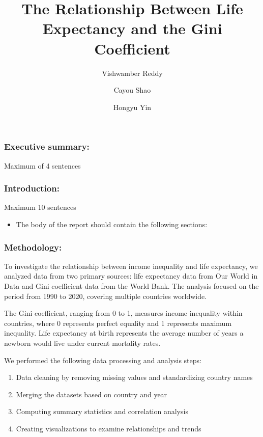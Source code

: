 \documentclass[
  11pt,
]{article}
\title{The Relationship Between Life Expectancy and the Gini
Coefficient}
\author{Vishwamber Reddy \and Cayou Shao \and Hongyu Yin}
\date{}
\providecommand{\tightlist}{%
  \setlength{\itemsep}{0pt}\setlength{\parskip}{0pt}}\usepackage{longtable,booktabs,array}
\renewcommand*\contentsname{Table of contents}
\newcommand\contentsname{Table of contents}
\begin{document}
\maketitle

\renewcommand*\contentsname{Table of contents}
{
\hypersetup{linkcolor=}
\setcounter{tocdepth}{3}
\tableofcontents
}

\subsubsection{Executive summary:}\label{executive-summary}

Maximum of 4 sentences

\subsubsection{Introduction:}\label{introduction}

Maximum 10 sentences

\begin{itemize}
\tightlist
\item
  The body of the report should contain the following sections:
\end{itemize}

\subsubsection{Methodology:}\label{methodology}

To investigate the relationship between income inequality and life
expectancy, we analyzed data from two primary sources: life expectancy
data from Our World in Data and Gini coefficient data from the World
Bank. The analysis focused on the period from 1990 to 2020, covering
multiple countries worldwide.

The Gini coefficient, ranging from 0 to 1, measures income inequality
within countries, where 0 represents perfect equality and 1 represents
maximum inequality. Life expectancy at birth represents the average
number of years a newborn would live under current mortality rates.

We performed the following data processing and analysis steps:

\begin{enumerate}
\def\labelenumi{\arabic{enumi}.}
\item
  Data cleaning by removing missing values and standardizing country
  names
\item
  Merging the datasets based on country and year
\item
  Computing summary statistics and correlation analysis
\item
  Creating visualizations to examine relationships and trends
\end{enumerate}
\end{document}
